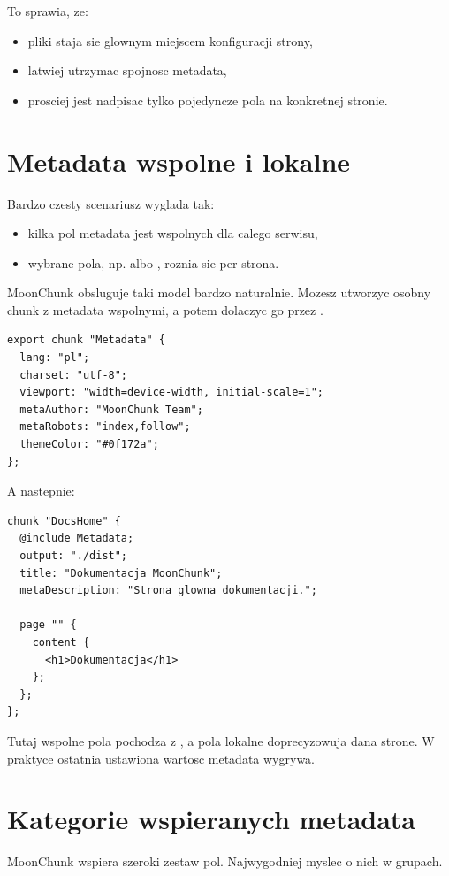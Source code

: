 To sprawia, ze:

\begin{itemize}
  \item pliki  staja sie glownym miejscem konfiguracji strony,
  \item latwiej utrzymac spojnosc metadata,
  \item prosciej jest nadpisac tylko pojedyncze pola na konkretnej stronie.
\end{itemize}

\section{Metadata wspolne i lokalne}
Bardzo czesty scenariusz wyglada tak:

\begin{itemize}
  \item kilka pol metadata jest wspolnych dla calego serwisu,
  \item wybrane pola, np.  albo , roznia sie per strona.
\end{itemize}

MoonChunk obsluguje taki model bardzo naturalnie. Mozesz utworzyc osobny chunk z
metadata wspolnymi, a potem dolaczyc go przez .

\begin{lstlisting}[style=moonchunk,caption={Wspolny chunk z metadata}]
export chunk "Metadata" {
  lang: "pl";
  charset: "utf-8";
  viewport: "width=device-width, initial-scale=1";
  metaAuthor: "MoonChunk Team";
  metaRobots: "index,follow";
  themeColor: "#0f172a";
};
\end{lstlisting}

A nastepnie:

\begin{lstlisting}[style=moonchunk,caption={Nadpisywanie wybranych metadata w konkretnym chunku}]
chunk "DocsHome" {
  @include Metadata;
  output: "./dist";
  title: "Dokumentacja MoonChunk";
  metaDescription: "Strona glowna dokumentacji.";

  page "" {
    content {
      <h1>Dokumentacja</h1>
    };
  };
};
\end{lstlisting}

Tutaj wspolne pola pochodza z , a pola lokalne doprecyzowuja dana strone.
W praktyce ostatnia ustawiona wartosc metadata wygrywa.

\section{Kategorie wspieranych metadata}
MoonChunk wspiera szeroki zestaw pol. Najwygodniej myslec o nich w grupach.

